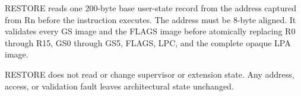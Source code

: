 RESTORE reads one 200-byte base user-state record from the address captured from Rn before the instruction executes. The address must be 8-byte aligned. It validates every GS image and the FLAGS image before atomically replacing R0 through R15, GS0 through GS5, FLAGS, LPC, and the complete opaque LPA image.

RESTORE does not read or change supervisor or extension state. Any address, access, or validation fault leaves architectural state unchanged.
